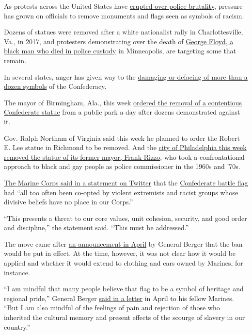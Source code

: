 As protests across the United States have
\href{https://www.nytimes.com/interactive/2020/05/30/us/george-floyd-protest-photos.html}{erupted
over police brutality}, pressure has grown on officials to remove
monuments and flags seen as symbols of racism.

Dozens of statues were removed after a white nationalist rally in
Charlottesville, Va., in 2017, and protesters demonstrating over the
death of
\href{https://www.nytimes.com/2020/05/29/us/minneapolis-police-george-floyd.html}{George
Floyd, a black man who died in police custody} in Minneapolis, are
targeting some that remain.

In several states, anger has given way to the
\href{https://www.nytimes.com/2020/06/03/us/confederate-statues-george-floyd.html}{damaging
or defacing of more than a dozen symbols} of the Confederacy.

The mayor of Birmingham, Ala., this week
\href{https://www.nytimes.com/2020/06/02/us/george-floyd-birmingham-confederate-statue.html}{ordered
the removal of a contentious Confederate statue} from a public park a
day after dozens demonstrated against it.

Gov. Ralph Northam of Virginia said this week he planned to order the
Robert E. Lee statue in Richmond to be removed. And the
\href{https://www.nytimes.com/2020/06/03/us/frank-rizzo-statue-removal.html}{city
of Philadelphia this week removed the statue of its former mayor, Frank
Rizzo}, who took a confrontational approach to black and gay people as
police commissioner in the 1960s and '70s.

\href{https://twitter.com/USMC/status/1269075089078784001/photo/1}{The
Marine Corps said in a statement on Twitter} that the
\href{https://www.nytimes.com/2020/07/06/us/politics/trump-bubba-wallace-nascar.html}{Confederate
battle flag} had ``all too often been co-opted by violent extremists and
racist groups whose divisive beliefs have no place in our Corps.''

``This presents a threat to our core values, unit cohesion, security,
and good order and discipline,'' the statement said. ``This must be
addressed.''

The move came after
\href{https://www.nytimes.com/2020/04/23/us/marine-corps-confederate-flag.html}{an
announcement in April} by General Berger that the ban would be put in
effect. At the time, however, it was not clear how it would be applied
and whether it would extend to clothing and cars owned by Marines, for
instance.

``I am mindful that many people believe that flag to be a symbol of
heritage and regional pride,'' General Berger
\href{https://mca-marines.org/wp-content/uploads/CMC-Letter-R1.pdf}{said
in a letter} in April to his fellow Marines. ``But I am also mindful of
the feelings of pain and rejection of those who inherited the cultural
memory and present effects of the scourge of slavery in our country.''

